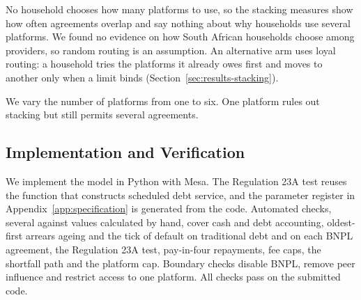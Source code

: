 No household chooses how many platforms to use, so the stacking measures show how often
agreements overlap and say nothing about why households use several platforms. We found
no evidence on how South African households choose among providers, so random routing is
an assumption. An alternative arm uses loyal routing: a household tries the platforms it
already owes first and moves to another only when a limit binds
(Section~\ref{sec:results-stacking}).

We vary the number of platforms from one to six. One platform rules out stacking but
still permits several agreements.

\subsection{Implementation and Verification}
\label{sec:implementation}

We implement the model in Python with Mesa. The Regulation 23A test reuses the
function that constructs scheduled debt service, and the parameter register in
Appendix~\ref{app:specification} is generated from the code. Automated checks, several against
values calculated by hand, cover cash and debt accounting, oldest-first arrears ageing and the
tick of default on traditional debt and on each \ac{BNPL} agreement, the Regulation 23A test, pay-in-four repayments, fee caps, the
shortfall path and the platform cap. Boundary checks disable
\ac{BNPL}, remove peer influence and restrict access to one platform. All checks pass on
the submitted code.
